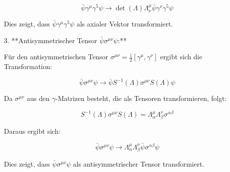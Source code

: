 \[
\bar{\psi} \gamma^\mu \gamma^5 \psi \rightarrow \operatorname{det}(\Lambda) \Lambda_\nu^\mu \bar{\psi} \gamma^\nu \gamma^5 \psi
\]

Dies zeigt, dass \(\bar{\psi} \gamma^\mu \gamma^5 \psi\) als axialer Vektor transformiert.

3. **Antisymmetrischer Tensor \(\bar{\psi} \sigma^{\mu \nu} \psi\):**

Für den antisymmetrischen Tensor \(\sigma^{\mu \nu} = \frac{\mathrm{i}}{2} [\gamma^\mu, \gamma^\nu]\) ergibt sich die Transformation:

\[
\bar{\psi} \sigma^{\mu \nu} \psi \rightarrow \bar{\psi} S^{-1}(\Lambda) \sigma^{\mu \nu} S(\Lambda) \psi
\]

Da \(\sigma^{\mu \nu}\) aus den \(\gamma\)-Matrizen besteht, die als Tensoren transformieren, folgt:

\[
S^{-1}(\Lambda) \sigma^{\mu \nu} S(\Lambda) = \Lambda_\alpha^\mu \Lambda_\beta^\nu \sigma^{\alpha \beta}
\]

Daraus ergibt sich:

\[
\bar{\psi} \sigma^{\mu \nu} \psi \rightarrow \Lambda_\alpha^\mu \Lambda_\beta^\nu \bar{\psi} \sigma^{\alpha \beta} \psi
\]

Dies zeigt, dass \(\bar{\psi} \sigma^{\mu \nu} \psi\) als antisymmetrischer Tensor transformiert.

